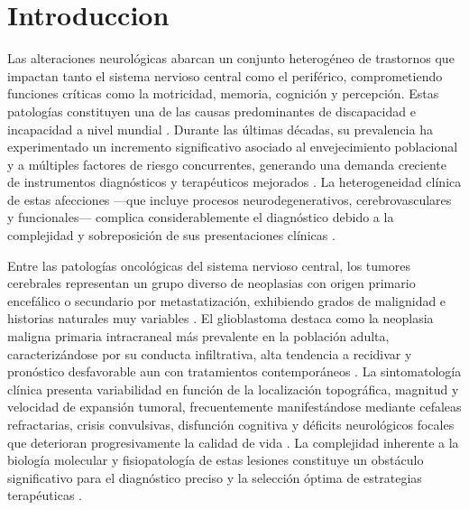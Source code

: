 \section{Introduccion}
\label{sec:introduction}

Las alteraciones neu\-ro\-ló\-gi\-cas abarcan un conjunto heterogéneo de trastornos que impactan tanto el sistema nervioso central como el periférico, comprometiendo funciones críticas como la motricidad, memoria, cognición y percepción. Estas patologías constituyen una de las causas predominantes de discapacidad e incapacidad a nivel mundial \cite{Ding2022}. Durante las últimas décadas, su prevalencia ha experimentado un incremento significativo asociado al envejecimiento poblacional y a múltiples factores de riesgo concurrentes, generando una demanda creciente de instrumentos diagnósticos y terapéuticos mejorados \cite{Ding2022}. La heterogeneidad clínica de estas afecciones —que incluye procesos neurodegenerativos, cerebrovasculares y funcionales— complica considerablemente el diagnóstico debido a la complejidad y sobreposición de sus presentaciones clínicas \cite{Mavroudis2024} \cite{Finkelstein2025}.

Entre las patologías oncológicas del sistema nervioso central, los tumores cerebrales representan un grupo diverso de neoplasias con origen primario encefálico o secundario por metastatización, exhibiendo grados de malignidad e historias naturales muy variables \cite{Pichaivel2022}. El glioblastoma destaca como la neoplasia maligna primaria intracraneal más prevalente en la población adulta, caracterizándose por su conducta infiltrativa, alta tendencia a recidivar y pronóstico desfavorable aun con tratamientos contemporáneos \cite{Schaff2023}. La sintomatología clínica presenta variabilidad en función de la localización topográfica, magnitud y velocidad de expansión tumoral, frecuentemente manifestándose mediante cefaleas refractarias, crisis convulsivas, disfunción cognitiva y déficits neurológicos focales que deterioran progresivamente la calidad de vida \cite{Barkade2023} \cite{Essianda2023}. La complejidad inherente a la biología molecular y fisiopatología de estas lesiones constituye un obstáculo significativo para el diagnóstico preciso y la selección óptima de estrategias terapéuticas \cite{Essianda2023}.

